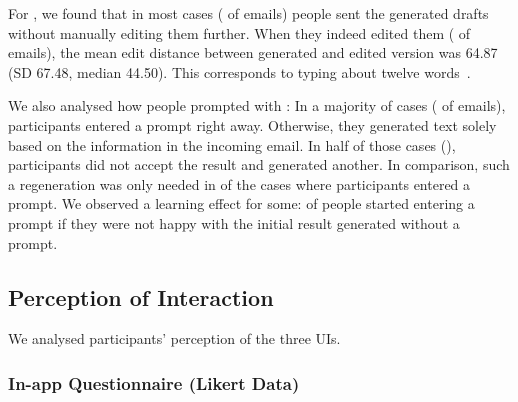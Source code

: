For \modemail, we found that in most cases ( of emails) people sent the generated drafts without manually editing them further. When they indeed edited them ( of emails), the mean edit distance between generated and edited version was 64.87 (SD 67.48, median 44.50). This corresponds to typing about twelve words~\cite{kristensson2014inviscid}.

We also analysed how people prompted with \modemail: In a majority of cases ( of emails), participants entered a prompt right away. Otherwise, they generated text solely based on the information in the incoming email. In half of those cases (), participants did not accept the result and generated another. In comparison, such a regeneration was only needed in  of the cases where participants entered a prompt. We observed a learning effect for some:  of people started entering a prompt if they were not happy with the initial result generated without a prompt. %



\subsection{Perception of Interaction}\label{sec:results_perception}
We analysed participants' perception of the three UIs.


\subsubsection{In-app Questionnaire (Likert Data)}\label{sec:results_in_app}


